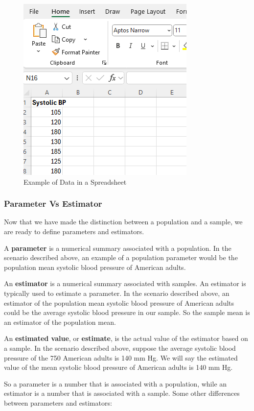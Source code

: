 \documentclass[
]{book}
\begin{document}
\begin{figure}
\centering
\includegraphics{images/07-dataframe.png}
\caption{\label{fig:07-dataframe}Example of Data in a Spreadsheet}
\end{figure}

\subsubsection{Parameter Vs Estimator}\label{parameter-vs-estimator}

Now that we have made the distinction between a population and a sample, we are ready to define parameters and estimators.

A \textbf{parameter} is a numerical summary associated with a population. In the scenario described above, an example of a population parameter would be the population mean systolic blood pressure of American adults.

An \textbf{estimator} is a numerical summary associated with samples. An estimator is typically used to estimate a parameter. In the scenario described above, an estimator of the population mean systolic blood pressure of American adults could be the average systolic blood pressure in our sample. So the sample mean is an estimator of the population mean.

An \textbf{estimated value}, or \textbf{estimate}, is the actual value of the estimator based on a sample. In the scenario described above, suppose the average systolic blood pressure of the 750 American adults is 140 mm Hg. We will say the estimated value of the mean systolic blood pressure of American adults is 140 mm Hg.

So a parameter is a number that is associated with a population, while an estimator is a number that is associated with a sample. Some other differences between parameters and estimators:
\end{document}
